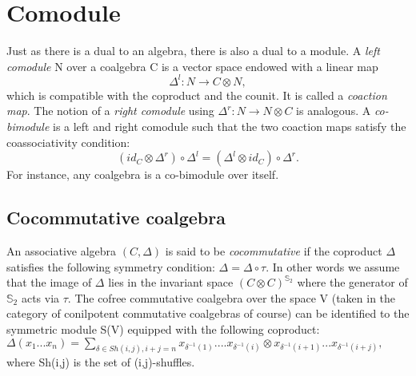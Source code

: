\documentclass[preprint, 5p, 10pt]{elsarticle}
\theoremstyle{plain}
\begin{document}
\section{Comodule}
Just as there is a dual to an algebra, there is also a dual to a module. 
A \textit{left comodule} N over a coalgebra C is a vector space endowed with a linear map
\begin{displaymath}
 \Delta^{l}:N \rightarrow C \otimes N,
\end{displaymath}
which is compatible with the coproduct and the counit. 
It is called a \textit{coaction map}. The notion of a \textit{right comodule} using 
$\Delta^{r}:N \rightarrow N \otimes C$ is analogous. A \emph{co-bimodule} is a left and right comodule 
such that the two coaction maps satisfy the coassociativity condition:
\begin{displaymath}
 (id_{C} \otimes \Delta^{r})\circ \Delta^{l}=(\Delta^{l} \otimes id_{C})\circ \Delta^{r}.
\end{displaymath}
For instance, any coalgebra is a co-bimodule over itself. 
\subsection{Cocommutative coalgebra}
An associative algebra $(C,\Delta)$ is said to be \emph{cocommutative} if the coproduct 
$\Delta$ satisfies the following symmetry condition:
$\Delta = \Delta \circ \tau.$
In other words we assume that the image of $\Delta$ lies in the invariant space $(C \otimes C)^{\mathbb{S}_{2}}$
where the generator of $\mathbb{S}_{2}$ acts via $\tau$. The cofree commutative coalgebra over the space V 
(taken in the category of conilpotent commutative coalgebras of course) can be identified to the symmetric
module S(V) equipped with the following coproduct:
$\Delta(x_{1}...x_{n})=\sum_{\delta \in Sh(i,j),i+j=n} x_{\delta^{-1}(1)}....x_{\delta^{-1}(i)}\otimes
x_{\delta^{-1}(i+1)}...x_{\delta^{-1}(i+j)},$
where Sh(i,j) is the set of (i,j)-shuffles.
\end{document}
